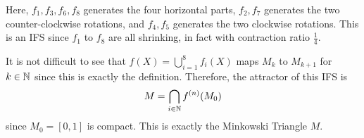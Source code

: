 \begin{itemize}
    Here, \(f_1, f_3, f_6, f_8\) generates the four horizontal parts, \(f_2, f_7\) generates the two counter-clockwise rotations, and \(f_4, f_5\) generates the two clockwise rotations. This is an IFS since \(f_1\) to \(f_8\) are all shrinking, in fact with contraction ratio \(\frac{1}{4}\).

    It is not difficult to see that \(f(X) = \bigcup_{i = 1}^{8} f_i(X)\) maps \(M_k\) to \(M_{k + 1}\) for \(k \in \mathbb{N}\) since this is exactly the definition. Therefore, the attractor of this IFS is
    \[
        M = \bigcap_{i \in \mathbb{N}} f^{(n)}(M_0)
    \]
    since \(M_0 = [0, 1]\) is compact. This is exactly the Minkowski Triangle \(M\).
\end{itemize}